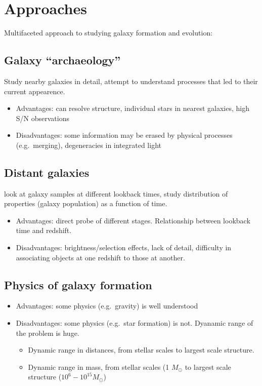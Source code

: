 \documentclass[12pt]{article}
\begin{document}
\section{Approaches}
    Multifaceted approach to studying galaxy formation and evolution:
    \subsection*{Galaxy ``archaeology''}
    Study nearby galaxies in detail,
    attempt to understand processes that led to their current
    appearence.
            \begin{itemize}
                \item Advantages: can resolve structure, individual stars
                    in nearest galaxies, high S/N observations
                \item Disadvantages: some information may be erased by
                    physical processes (e.g.\ merging), degeneracies in
                    integrated light
            \end{itemize}
   \subsection*{Distant galaxies}
   look at galaxy samples at different lookback
   times, study distribution of properties (galaxy population) as
   a function of time.
            \begin{itemize}
                \item Advantages: direct probe of different stages.
                    Relationship between lookback time and redshift.
                \item Disadvantages: brightness/selection effects, lack
                    of detail, difficulty in associating objects at one redshift
                    to those at another.
            \end{itemize}
   \subsection*{Physics of galaxy formation}
            \begin{itemize}
                \item Advantages: some physics (e.g.\ gravity) is well
                    understood
                \item Disadvantages: some physics (e.g.\ star formation)
                    is not. Dyanamic range of the problem is huge.
                    \begin{itemize}
                        \item Dynamic range in distances, from stellar scales
                            to largest scale structure.
                        \item Dynamic range in mass, from stellar scales
                            (1 $M_{\odot}$ to
                            largest scale structure ($10^6-10^{15} M_{\odot}$)
                    \end{itemize}
            \end{itemize}
\end{document}
